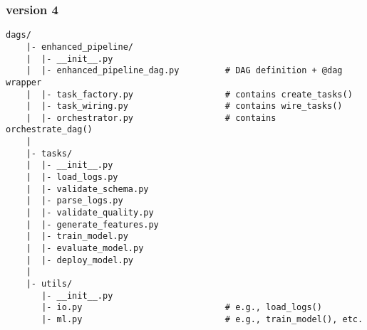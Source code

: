 \subsubsection{version 4}

\begin{lstlisting}[style=tree, caption={Modular DAG file structure (ASCII-safe)}, label={lst:dag_tree_ascii}]
    dags/
    |- enhanced_pipeline/
    |  |- __init__.py
    |  |- enhanced_pipeline_dag.py         # DAG definition + @dag wrapper
    |  |- task_factory.py                  # contains create_tasks()
    |  |- task_wiring.py                   # contains wire_tasks()
    |  |- orchestrator.py                  # contains orchestrate_dag()
    |
    |- tasks/
    |  |- __init__.py
    |  |- load_logs.py
    |  |- validate_schema.py
    |  |- parse_logs.py
    |  |- validate_quality.py
    |  |- generate_features.py
    |  |- train_model.py
    |  |- evaluate_model.py
    |  |- deploy_model.py
    |
    |- utils/
       |- __init__.py
       |- io.py                            # e.g., load_logs()
       |- ml.py                            # e.g., train_model(), etc.
    
\end{lstlisting}

